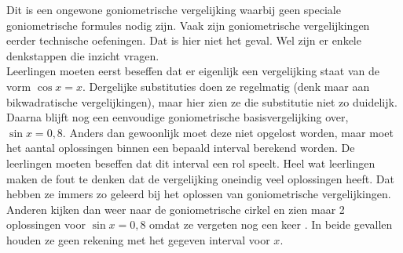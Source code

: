 Dit is een ongewone goniometrische vergelijking waarbij geen speciale goniometrische formules nodig zijn. Vaak zijn goniometrische vergelijkingen eerder technische oefeningen. Dat is hier niet het geval. Wel zijn er enkele denkstappen die inzicht vragen.\\ Leerlingen moeten eerst beseffen dat er eigenlijk een vergelijking staat van de vorm $\cos x=x$. Dergelijke substituties doen ze regelmatig (denk maar aan bikwadratische vergelijkingen), maar hier zien ze die substitutie niet zo duidelijk. Daarna blijft nog een eenvoudige goniometrische basisvergelijking over, $\sin x=0,8$. Anders dan gewoonlijk moet deze niet opgelost worden, maar moet het aantal oplossingen binnen een bepaald interval berekend worden. De leerlingen moeten beseffen dat dit interval een rol speelt. Heel wat leerlingen maken de fout te denken dat de vergelijking oneindig veel oplossingen heeft. Dat hebben ze immers zo geleerd bij het oplossen van goniometrische vergelijkingen.  Anderen kijken dan weer naar de goniometrische cirkel en zien maar 2 oplossingen voor $\sin x=0,8$ omdat ze vergeten nog een keer . In beide gevallen houden ze geen rekening met het gegeven interval voor $x$.































